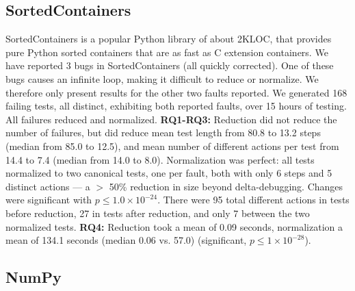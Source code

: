 \subsection{SortedContainers}

SortedContainers \cite{SortedContainers} is a popular Python library
of about 2KLOC, that provides pure Python sorted containers that are as fast as C
extension containers.  We have reported 3 bugs in SortedContainers
(all quickly corrected).  One of these bugs causes an infinite loop,
making it difficult to reduce or normalize.  We therefore only present
results for the other two faults reported.  We
generated 168 failing tests, all distinct, exhibiting both reported
faults, over 15 hours of testing. All failures reduced and normalized.
{\bf RQ1-RQ3:} Reduction did not reduce
the number of failures, but did reduce mean test length from
80.8 to 13.2 steps (median from 85.0 to 12.5), and mean number of
different actions per test from 14.4 to 7.4 (median from 14.0 to 8.0).
Normalization was perfect:  all tests normalized to two canonical
tests, one per fault, both with only 6 steps and 5
distinct actions --- a $>$ 50\% reduction in size beyond delta-debugging.  Changes were significant with
$p\leq1.0\times10^{-24}$.  There were 95 total
different actions in tests before reduction, 27 in tests after
reduction, and only 7 between the two normalized tests.  {\bf RQ4:} Reduction took a mean of 0.09 seconds, normalization a mean of 134.1
seconds (median 0.06 vs. 57.0) (significant, $p\leq1\times10^{-28}$).  

\subsection{NumPy}

